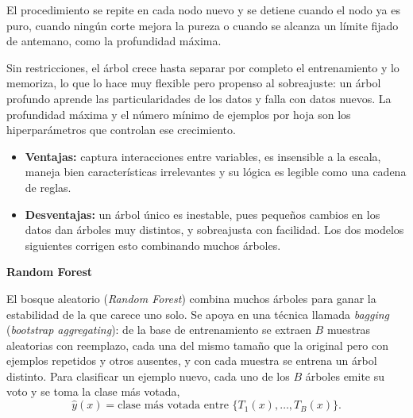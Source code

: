 \documentclass[12pt,a4paper]{report}
\theoremstyle{definition}
\begin{document}
El procedimiento se repite en cada nodo nuevo y se detiene cuando el nodo ya es puro, cuando ningún
corte mejora la pureza o cuando se alcanza un límite fijado de antemano, como la profundidad máxima.

Sin restricciones, el árbol crece hasta separar por completo el entrenamiento y lo memoriza, lo que lo
hace muy flexible pero propenso al sobreajuste: un árbol profundo aprende las particularidades de los
datos y falla con datos nuevos. La profundidad máxima y el número mínimo de ejemplos por hoja son los
hiperparámetros que controlan ese crecimiento.

\begin{itemize}
\item \textbf{Ventajas:} captura interacciones entre variables, es insensible a la escala, maneja bien
características irrelevantes y su lógica es legible como una cadena de reglas.
\item \textbf{Desventajas:} un árbol único es inestable, pues pequeños cambios en los datos dan árboles
muy distintos, y sobreajusta con facilidad. Los dos modelos siguientes corrigen esto combinando muchos
árboles.
\end{itemize}

\bigskip
\noindent\textbf{\large Random Forest}
\label{sec:rf}

\medskip
El bosque aleatorio (\emph{Random Forest}) \cite{breiman2001rf} combina muchos árboles para ganar la
estabilidad de la que carece uno solo. Se apoya en una técnica llamada \emph{bagging} (\emph{bootstrap
aggregating}): de la base de entrenamiento se extraen $B$ muestras aleatorias con reemplazo, cada una
del mismo tamaño que la original pero con ejemplos repetidos y otros ausentes, y con cada muestra se
entrena un árbol distinto. Para clasificar un ejemplo nuevo, cada uno de los $B$ árboles emite su voto
y se toma la clase más votada,
\begin{equation}
\hat{y}(x) = \text{clase más votada entre } \{T_1(x),\dots,T_B(x)\}.
\label{eq:voto}
\end{equation}
\end{document}
